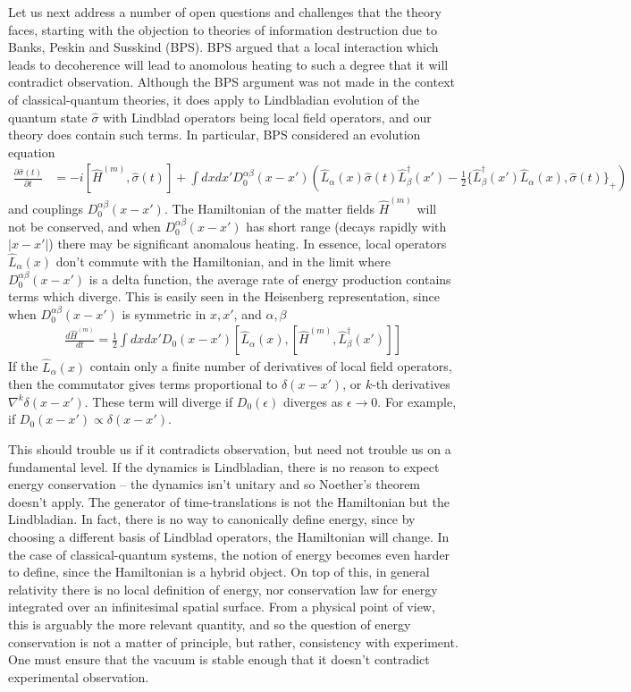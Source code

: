 \documentclass[aps,pra,showpacs,citeautoscript,amsmath,amssymb,floatfix,superscriptaddress,bbm, verbatim,amsfonts,changes,10pt,nofootinbib,longbibliography]{revtex4-1}
\def\L{{\hat{L}}}
\def\qmatterham{\hat{H}^{(m)}}
\def\ab{^{\alpha\beta}}
\def\lax{{\L_\alpha(x)}}
\def\lbxp{{\L^\dagger_\beta(x')}}
\begin{document}
Let us next address a number of open questions and challenges that the theory faces, starting with the objection to theories of information destruction due to Banks, Peskin and Susskind\label{par:bps} (BPS)\cite{bps}. BPS argued
that a local interaction which leads to decoherence will 
lead to anomolous heating to such a degree that it will contradict observation. Although the BPS argument was not made in the context of classical-quantum theories, it does apply to Lindbladian evolution of the quantum state $\hat{\sigma}$ with Lindblad operators being local field operators, and our theory does contain such terms. In particular, BPS considered an evolution equation
\begin{align}
\frac{\partial\hat{\sigma}(t)}{\partial t}
&=-i[\qmatterham,\hat{\sigma}(t)]
+ \int dxdx'
D_0\ab(x-x')\left( 
\L_{\alpha}(x)\hat{\sigma}(t)\L_{\beta}^\dagger(x')
-
\frac{1}{2}\{\lbxp\lax,\hat{\sigma}(t)\}_+ \right)  
\end{align}
 and couplings $D_0\ab(x-x')$.
The Hamiltonian of the matter fields $\qmatterham$ will not be conserved, and when $D_0\ab(x-x')$ has short range (decays rapidly with $|x-x'|$) there may be significant anomalous heating. In essence, local operators $\L_{\alpha}(x)$ don't commute with the Hamiltonian, and in the limit where $D_0\ab(x-x')$ is a delta function, the average rate of energy production contains terms which diverge. This is easily seen in the Heisenberg representation, since when $D_0\ab(x-x')$ is symmetric in $x,x'$, and $\alpha,\beta$ 
\begin{align}
\frac{d{\qmatterham}}{dt} =\frac{1}{2}\int dx dx' D_0(x-x')[\L_{\alpha}(x),[\qmatterham,\L^\dagger_\beta(x')]]
\label{eq:heating}
\end{align} 
If the $\L_{\alpha}(x)$ contain only a finite number of derivatives of local field operators, then the commutator gives terms proportional to $\delta(x-x')$, or $k$-th derivatives $\nabla^k\delta(x-x')$. These term will diverge if $D_0(\epsilon)$ diverges as $\epsilon\rightarrow 0$. For example, if $D_0(x-x')\propto \delta(x-x')$. 

This should trouble us if it contradicts observation, but need not trouble us on a fundamental level. If the dynamics is Lindbladian, there is no reason to expect energy conservation -- the dynamics isn't unitary and so Noether's theorem doesn't apply. The generator of time-translations is not the Hamiltonian but the Lindbladian\cite{Noether_foot}. In fact, there is no way to canonically define energy, since by choosing a different basis of Lindblad operators, the Hamiltonian will change.
In the case of classical-quantum systems, the notion of energy becomes even harder to  define, since the Hamiltonian is a hybrid object. 
On top of this, in general relativity there is no local definition of energy, nor conservation law for energy integrated over an infinitesimal spatial surface\cite{brown1992quasilocal}.  From a physical point of view, this is arguably the more relevant quantity, and so the question of energy conservation is not a matter of principle, but rather, consistency with experiment. 
One must ensure that the vacuum is stable enough that it doesn't contradict experimental observation.
\end{document}
